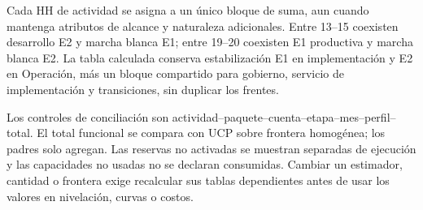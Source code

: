 Cada HH de actividad se asigna a un único bloque de suma, aun cuando mantenga atributos de alcance y naturaleza adicionales. Entre 13--15 coexisten desarrollo E2 y marcha blanca E1; entre 19--20 coexisten E1 productiva y marcha blanca E2. La tabla calculada conserva estabilización E1 en implementación y E2 en Operación, más un bloque compartido para gobierno, servicio de implementación y transiciones, sin duplicar los frentes.

Los controles de conciliación son actividad--paquete--cuenta--etapa--mes--perfil--total. El total funcional se compara con UCP sobre frontera homogénea; los padres solo agregan. Las reservas no activadas se muestran separadas de ejecución y las capacidades no usadas no se declaran consumidas. Cambiar un estimador, cantidad o frontera exige recalcular sus tablas dependientes antes de usar los valores en nivelación, curvas o costos.

